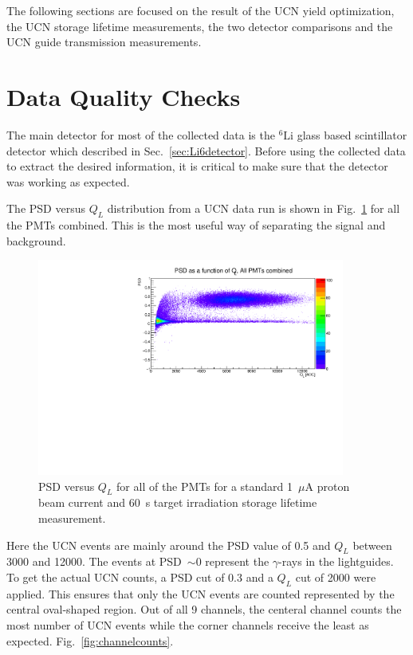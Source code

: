 The following sections are focused on the result of the UCN yield
optimization, the UCN storage lifetime measurements, the two detector
comparisons and the UCN guide transmission measurements.


\section {Data Quality Checks}
The main detector for most of the collected data is the
$^6\mathrm{Li}$ glass based scintillator detector which described in
Sec.~\ref{sec:Li6detector}. Before using the collected data to
extract the desired information, it is critical to make sure that the
detector was working as expected.


The PSD versus $Q_L$ distribution from a UCN data run is shown in
Fig.~\ref{fig:psd_vs_ql} for all the PMTs combined. This is the most useful
way of separating the signal and background.
\begin{figure}[h!]
  \centering
  \includegraphics[width=0.9\textwidth]{PSD_vs_QL.pdf}
  \caption{PSD versus $Q_L$ for all of the PMTs for a standard
    1~$\mu$A proton beam current and 60~s target irradiation storage
    lifetime measurement. }
  \label{fig:psd_vs_ql}
\end{figure}
Here the UCN events are mainly around the PSD value of 0.5 and $Q_L$
between 3000 and 12000. The events at PSD~$\sim 0$ represent the
$\gamma$-rays in the lightguides. To get the actual UCN counts, a PSD
cut of 0.3 and a $Q_L$ cut of 2000 were applied. This ensures that
only the UCN events are counted represented by the central oval-shaped
region. Out of all 9 channels, the centeral channel counts the most
number of UCN events while the corner channels receive the least as
expected. Fig.~\ref{fig:channelcounts}.

